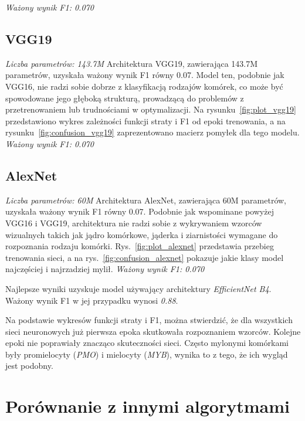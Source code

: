 \textit{Ważony wynik F1: 0.070}

\subsection{VGG19}
\textit{Liczba parametrów: 143.7M}
Architektura VGG19, zawierająca 143.7M parametrów, uzyskała ważony wynik F1 równy 0.07. Model ten, podobnie jak VGG16, nie radzi sobie dobrze z klasyfikacją rodzajów komórek, co może być spowodowane jego głęboką strukturą, prowadzącą do problemów z przetrenowaniem lub trudnościami w optymalizacji. Na rysunku~\ref{fig:plot_vgg19} przedstawiono wykres zależności funkcji straty i F1 od epoki trenowania, a na rysunku~\ref{fig:confusion_vgg19} zaprezentowano macierz pomyłek dla tego modelu.
\textit{Ważony wynik F1: 0.070}


\subsection{AlexNet}
\textit{Liczba parametrów: 60M}
Architektura AlexNet, zawierająca 60M parametrów, uzyskała ważony wynik F1 równy 0.07. Podobnie jak wspominane powyżej VGG16 i VGG19, architektura nie radzi sobie z wykrywaniem wzorców wizualnych takich jak jądro komórkowe, jąderka i ziarnistości wymagane do rozpoznania rodzaju komórki. Rys.~\ref{fig:plot_alexnet} przedstawia przebieg trenowania sieci, a na rys.~\ref{fig:confusion_alexnet} pokazuje jakie klasy model najczęściej i najrzadziej mylił.
\textit{Ważony wynik F1: 0.070}

\newline
\newline
\newline

Najlepsze wyniki uzyskuje model używający architektury \textit{EfficientNet B4}.
Ważony wynik F1 w jej przypadku wynosi \textit{0.88}.

Na podstawie wykresów funkcji straty i F1, można stwierdzić, że dla wszystkich sieci neuronowych już pierwsza epoka skutkowała rozpoznaniem wzorców.
Kolejne epoki nie poprawiały znacząco skuteczności sieci.
Często mylonymi komórkami były promielocyty (\textit{PMO}) i mielocyty (\textit{MYB}), wynika to z tego, że ich wygląd jest podobny.


\section{Porównanie z innymi algorytmami}

